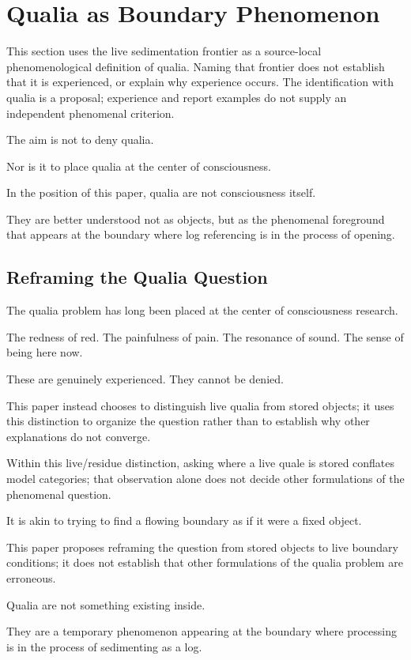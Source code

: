 \section{Qualia as Boundary Phenomenon}


This section uses the live sedimentation frontier as a source-local phenomenological definition of qualia. Naming that frontier does not establish that it is experienced, or explain why experience occurs. The identification with qualia is a proposal; experience and report examples do not supply an independent phenomenal criterion.

The aim is not to deny qualia.

Nor is it to place qualia at the center of consciousness.

In the position of this paper, qualia are not consciousness itself.

They are better understood not as objects, but as the phenomenal foreground that appears at the boundary where log referencing is in the process of opening.

\subsection{Reframing the Qualia Question}


The qualia problem has long been placed at the center of consciousness research.

The redness of red. The painfulness of pain. The resonance of sound. The sense of being here now.

These are genuinely experienced. They cannot be denied.

This paper instead chooses to distinguish live qualia from stored objects; it uses this distinction to organize the question rather than to establish why other explanations do not converge.

Within this live/residue distinction, asking where a live quale is stored conflates model categories; that observation alone does not decide other formulations of the phenomenal question.

It is akin to trying to find a flowing boundary as if it were a fixed object.

This paper proposes reframing the question from stored objects to live boundary conditions; it does not establish that other formulations of the qualia problem are erroneous.

Qualia are not something existing inside.

They are a temporary phenomenon appearing at the boundary where processing is in the process of sedimenting as a log.

